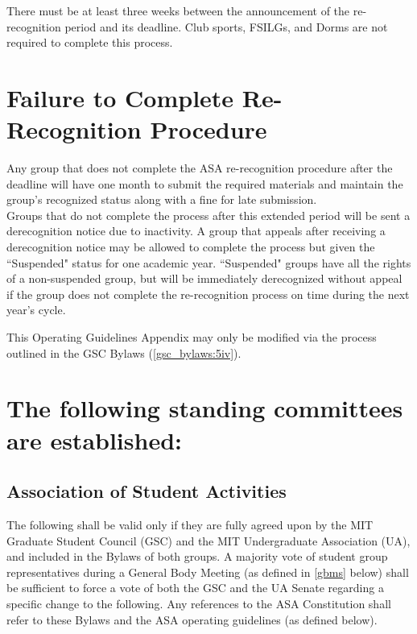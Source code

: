 \documentclass[12pt]{constitution}
\begin{document}
There must be at least three weeks between the announcement of the re-recognition period and its
    deadline. Club sports, FSILGs, and Dorms are not required to complete this process.

\section{Failure to Complete Re-Recognition Procedure}
Any group that does not complete the ASA re-recognition procedure after the deadline will have one
    month to submit the required materials and maintain the group's recognized status along with a
    fine for late submission.
\\

Groups that do not complete the process after this extended period will be sent a derecognition notice
    due to inactivity.
A group that appeals after receiving a derecognition notice may be allowed to complete the process
    but given the ``Suspended" status for one academic year.
``Suspended" groups have all the rights of a non-suspended group, but will be immediately derecognized
    without appeal if the group does not complete the re-recognition process on time during the next year's cycle.

This Operating Guidelines Appendix may only be modified via the process outlined in the GSC Bylaws (\ref{gsc_bylaws:5iv}).



\label{app:C}

\setcounter{article}{1}

\setcounter{section}{6}
\let\sectionnumstyle\Alph

\section{The following standing committees are established:}

\setcounter{subsection}{4}
\subsection{Association of Student Activities}
The following shall be valid only if they are fully agreed upon by the MIT Graduate Student Council (GSC)
    and the MIT Undergraduate Association (UA), and included in the Bylaws of both groups.
A majority vote of student group representatives during a General Body Meeting
    (as defined in \ref{gbms} below) shall be sufficient to force a vote of both the GSC
    and the UA Senate regarding a specific change to the following.
Any references to the ASA Constitution shall refer to these Bylaws and the ASA operating guidelines (as defined below).
\end{document}
